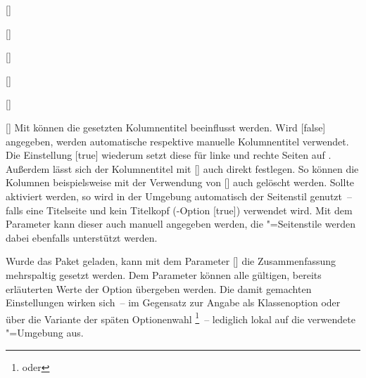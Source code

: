 \begin{Declaration*}{}
\begin{Declaration*}{}
\begin{Declaration*}{}
\begin{Declaration}{[]}
\begin{Declaration}[v2.02]{}
\begin{Declaration}{[]}
\begin{Declaration}[v2.02]{%
  []%
}
\begin{Declaration}[v2.02]{%
  []%
}
\begin{Declaration}{[]}
\begin{Declaration}{[\PSet]}{%
}
Mit  können die gesetzten Kolumnentitel 
beeinflusst werden. Wird [false] 
angegeben, werden automatische respektive manuelle Kolumnentitel verwendet. Die 
Einstellung [true] wiederum setzt diese 
für linke und rechte Seiten auf . Außerdem lässt sich der 
Kolumnentitel mit [] 
auch direkt festlegen. So können die Kolumnen beispielsweise mit der Verwendung 
von [\PParameter{}] auch gelöscht werden. 
Sollte  aktiviert werden, so wird in der
Umgebung automatisch der Seitenstil  genutzt~-- falls eine 
Titelseite und kein Titelkopf (\KOMAScript-Option [true]) 
verwendet wird. Mit dem Parameter  kann 
dieser auch manuell angegeben werden, die "=Seitenstile 
werden dabei ebenfalls unterstützt werden.

Wurde das Paket  geladen, kann mit dem Parameter 
[] die Zusammenfassung 
mehrspaltig gesetzt werden. Dem Parameter  
können alle gültigen, bereits erläuterten Werte der Option  
übergeben werden. Die damit gemachten Einstellungen wirken sich~-- im Gegensatz 
zur Angabe als Klassenoption oder über die Variante der späten Optionenwahl%
\footnote{%
   oder
}~-- lediglich lokal auf die verwendete "=Umgebung aus.


\end{Declaration}
\end{Declaration}
\end{Declaration}
\end{Declaration}
\end{Declaration}
\end{Declaration}
\end{Declaration}
\end{Declaration*}
\end{Declaration*}
\end{Declaration*}

